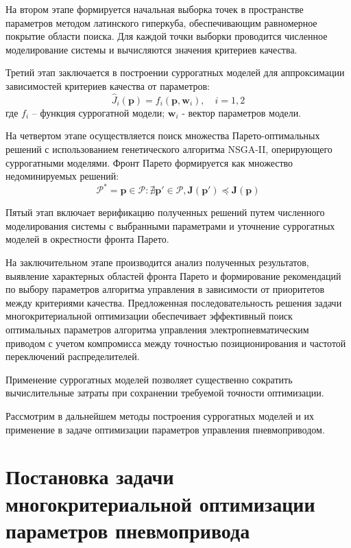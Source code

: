 На втором этапе формируется начальная выборка точек в пространстве параметров
методом латинского гиперкуба, обеспечивающим равномерное покрытие области
поиска. Для каждой точки выборки проводится численное моделирование системы и вычисляются значения критериев качества.

Третий этап заключается в построении суррогатных моделей для аппроксимации зависимостей критериев качества от параметров:
\begin{equation}
\hat{J}_i(\mathbf{p}) = f_i(\mathbf{p}, \mathbf{w}_i), \quad i = 1,2
\end{equation}
где $f_i$ -- функция суррогатной модели;
$\mathbf{w}_i$ - вектор параметров модели.

На четвертом этапе осуществляется поиск множества Парето-оптимальных
решений с использованием генетического алгоритма NSGA-II, оперирующего
суррогатными моделями. Фронт Парето формируется как множество недоминируемых решений:
\begin{equation}
\mathcal{P}^* = {\mathbf{p} \in \mathcal{P}: \nexists \mathbf{p}' \in \mathcal{P}, \mathbf{J}(\mathbf{p}') \preceq \mathbf{J}(\mathbf{p})}
\end{equation}

Пятый этап включает верификацию полученных решений путем численного моделирования
системы с выбранными параметрами и уточнение суррогатных моделей в окрестности фронта Парето.

На заключительном этапе производится анализ полученных результатов,
выявление характерных областей фронта Парето и формирование
рекомендаций по выбору параметров алгоритма управления в зависимости от приоритетов между критериями качества.
Предложенная последовательность решения задачи многокритериальной оптимизации
обеспечивает эффективный поиск оптимальных параметров алгоритма
управления электропневматическим приводом с учетом компромисса
между точностью позиционирования и частотой переключений распределителей.

Применение суррогатных моделей позволяет существенно сократить вычислительные затраты при сохранении требуемой точности оптимизации.

Рассмотрим в дальнейшем методы построения суррогатных моделей
и их применение в задаче оптимизации параметров управления пневмоприводом.

\section{Постановка задачи многокритериальной оптимизации параметров пневмопривода}\label{ch:ch4/sec2}

